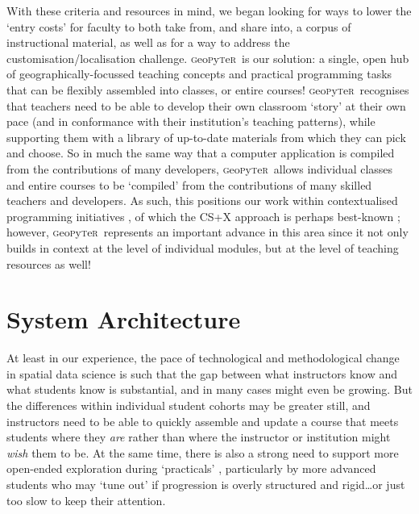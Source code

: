 \documentclass[letter, 11pt,titlepage]{article}
\newcommand{\gp}{\textsc{g}eo\textsc{p}y\textsc{t}e\textsc{r}~\/}
\newcommand{\eg}{e.g.~\/}
\begin{document}
With these criteria and resources in mind, we began looking for ways to lower the `entry costs' for faculty to both take from, and share into, a corpus of instructional material, as well as for a way to address the customisation/localisation challenge. \gp is our solution: a single, open hub of geographically-focussed teaching concepts and practical programming tasks that can be flexibly assembled into classes, or entire courses! \gp recognises that teachers need to be able to develop their own classroom `story' at their own pace (and in conformance with their institution's teaching patterns), while supporting them with a library of up-to-date materials from which they can pick and choose. So in much the same way that a computer application is compiled from the contributions of many developers, \gp allows individual classes and entire courses to be `compiled' from the contributions of many skilled teachers and developers. As such, this positions our work within contextualised programming initiatives \citep{Guzdial2010,Lukkarinen2016}, of which the CS+X approach is perhaps best-known \citep[\eg][]{Mir2017}; however, \gp represents an important advance in this area since it not only builds in context at the level of individual modules, but at the level of teaching resources as well!

\section{System Architecture}\label{system-architecture}

At least in our experience, the pace of technological and methodological change in spatial data science is such that the gap between what instructors know and what students know is substantial, and in many cases might even be growing. But the differences within individual student cohorts may be greater still, and instructors need to be able to quickly assemble and update a course that meets students where they \emph{are} rather than where the instructor or institution might \emph{wish} them to be. At the same time, there is also a strong need to support more open-ended exploration during `practicals' \citep{Unwin1980}, particularly by more advanced students who may `tune out' if progression is overly structured and rigid\ldots or just too slow to keep their attention.
\end{document}
